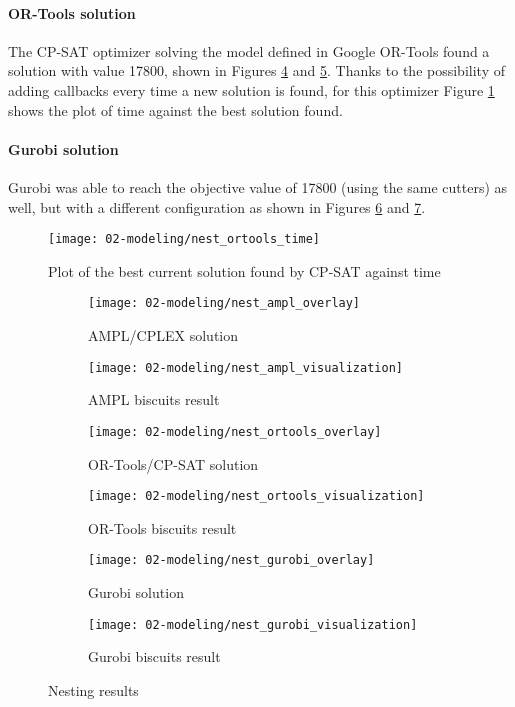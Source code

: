 \paragraph{OR-Tools solution} 
The CP-SAT optimizer solving the model defined in Google OR-Tools found a solution with value 17800, shown in Figures \ref{fig:ortools_nest_overlay} and \ref{fig:ortools_nest_vis}. Thanks to the possibility of adding callbacks every time a new solution is found, for this optimizer Figure \ref{fig:ortools_time} shows the plot of time against the best solution found. 

\paragraph{Gurobi solution}
Gurobi was able to reach the objective value of 17800 (using the same cutters) as well, but with a different configuration as shown in Figures \ref{fig:gurobi_nest_overlay} and \ref{fig:gurobi_nest_vis}.

\begin{figure}[H]
	\centering	
	\texttt{[image: 02-modeling/nest\_ortools\_time]}
	\caption{Plot of the best current solution found by CP-SAT against time}
	\label{fig:ortools_time}
\end{figure}

\begin{figure}[p]
	\begin{subfigure}[b]{.43\textwidth}
		\centering
		\texttt{[image: 02-modeling/nest\_ampl\_overlay]}
		\caption{AMPL/CPLEX solution}
		\label{fig:ampl_nest_overlay}
	\end{subfigure} 
	\hfill
	\begin{subfigure}[b]{.43\textwidth}
		\centering
		\texttt{[image: 02-modeling/nest\_ampl\_visualization]}
		\caption{AMPL biscuits result}
		\label{fig:ampl_nest_vis}
	\end{subfigure}
	\vfill	
	\begin{subfigure}[b]{.43\textwidth}
		\centering
		\texttt{[image: 02-modeling/nest\_ortools\_overlay]}
		\caption{OR-Tools/CP-SAT solution}
		\label{fig:ortools_nest_overlay}
	\end{subfigure} 
	\hfill
	\begin{subfigure}[b]{.43\textwidth}
		\centering
		\texttt{[image: 02-modeling/nest\_ortools\_visualization]}
		\caption{OR-Tools biscuits result}
		\label{fig:ortools_nest_vis}
	\end{subfigure}

	\vfill
	
	\begin{subfigure}[b]{.43\textwidth}
		\centering
		\texttt{[image: 02-modeling/nest\_gurobi\_overlay]}
		\caption{Gurobi solution}
		\label{fig:gurobi_nest_overlay}
	\end{subfigure} 
	\hfill
	\begin{subfigure}[b]{.43\textwidth}
		\centering
		\texttt{[image: 02-modeling/nest\_gurobi\_visualization]}
		\caption{Gurobi biscuits result}
		\label{fig:gurobi_nest_vis}
	\end{subfigure}
	\caption{Nesting results}
	\label{fig:nesting_results}
\end{figure}
